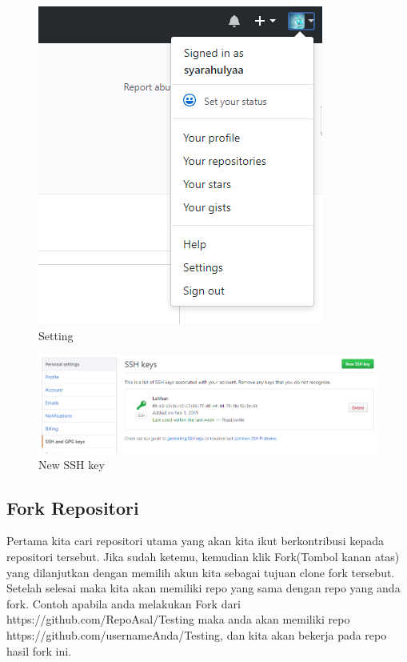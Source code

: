 \begin{enumerate}
\begin{figure}[!htbp]
\centerline{\includegraphics[width=.75\textwidth]{Figures/setting.PNG}}
\caption{Setting}
\label{setting}
\end{figure}
\begin{figure}[!htbp]
\centerline{\includegraphics[width=.75\textwidth]{Figures/sshkeys}}
\caption{New SSH key}
\label{sshkeys}
\end{figure}
\end{enumerate}


\subsection{Fork Repositori}
Pertama kita cari repositori utama yang akan kita ikut berkontribusi kepada repositori tersebut. Jika sudah ketemu, kemudian klik Fork(Tombol kanan atas) yang dilanjutkan dengan memilih akun kita sebagai tujuan clone fork tersebut. Setelah selesai maka kita akan memiliki repo yang sama dengan repo yang anda fork. Contoh apabila anda melakukan Fork dari https://github.com/RepoAsal/Testing maka anda akan memiliki repo https://github.com/usernameAnda/Testing, dan kita akan bekerja pada repo hasil fork ini.


